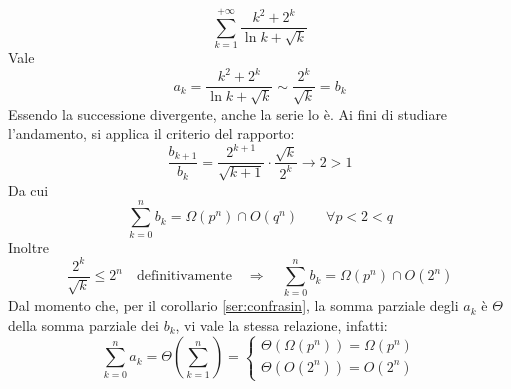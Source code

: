 \begin{examp}
	\[
		\sum_{k=1}^{+\infty} \frac{k^2+2^k}{\ln k +\sqrt k}
	\]
	Vale
	\[
		a_k=\frac{k^2+2^k}{\ln k +\sqrt k}\sim \frac{2^k}{\sqrt k}=b_k
	\]
	Essendo la successione divergente, anche la serie lo è. Ai fini di studiare l'andamento, si applica il criterio del rapporto:
	\[
		\frac{b_{k+1}}{b_k}=\frac{2^{k+1}}{\sqrt{k+1}}\cdot\frac{\sqrt k}{2^k}\to 2>1
	\]
	Da cui
	\[
		\sum_{k=0}^n b_k=\Omega(p^n)\cap O(q^n)\qquad \forall p<2<q
	\]
	Inoltre
	\[
		\frac{2^k}{\sqrt k}\leq 2^n\quad\text{definitivamente}\quad\Rightarrow\quad \sum_{k=0}^n b_k=\Omega(p^n)\cap O(2^n)
	\]
	Dal momento che, per il corollario \ref{ser:confrasin}, la somma parziale degli $a_k$ è $\Theta$ della somma parziale dei $b_k$, vi vale la stessa relazione, infatti:
	\[
		\sum_{k=0}^n a_k = \Theta\left(\sum_{k=1}^n\right)=
		\begin{cases}
			\Theta(\Omega(p^n))=\Omega(p^n) \\
			\Theta(O(2^n))=O(2^n)
		\end{cases}
	\]
\end{examp}
